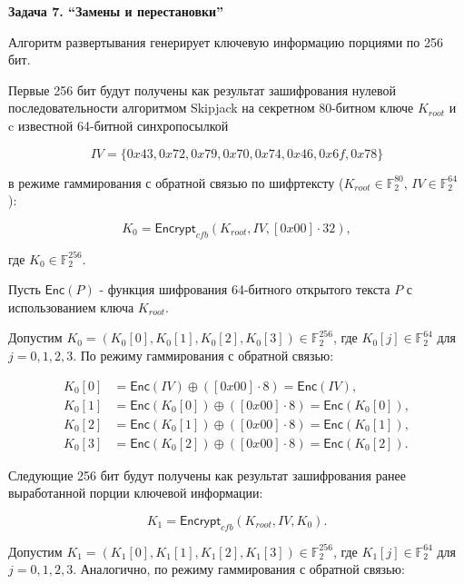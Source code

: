 \documentclass{article}
\newcommand{\FF}{\mathbb{F}}
\newcommand{\Enc}{\mathsf{Encrypt}}
\newcommand{\E}{\mathsf{Enc}}
\begin{document}
\begin{center}
    \Huge\textbf{Задача 7. ``Замены и перестановки''}
\end{center}

Алгоритм развертывания генерирует ключевую информацию порциями по 256 бит.

Первые 256 бит будут получены как результат зашифрования нулевой последовательности алгоритмом Skipjack на секретном 80-битном ключе $K_{root}$ и c известной 64-битной синхропосылкой

\begin{equation*}
    IV = \{ 0x43, 0x72, 0x79, 0x70, 0x74, 0x46, 0x6f, 0x78 \}
\end{equation*}

\noindent в режиме гаммирования с обратной связью по шифртексту ($K_{root} \in \FF_2^{80}$, $IV \in \FF_2^{64}$):

\begin{equation*}
    K_0 = \Enc_{cfb}(K_{root}, IV, [0x00] \cdot 32),
\end{equation*}

\noindent где $K_0 \in \FF_2^{256}$.

Пусть $\E(P)$ - функция шифрования 64-битного открытого текста $P$ с использованием ключа $K_{root}$.

Допустим $K_0 = (K_0[0], K_0[1], K_0[2], K_0[3]) \in \FF_2^{256}$, где $K_0[j] \in \FF_2^{64}$ для $j = 0, 1, 2, 3$. По режиму гаммирования с обратной связью:

\begin{align*}
    K_0[0] & = \E(IV) \oplus ([0x00] \cdot 8) = \E(IV), \\
    K_0[1] & = \E(K_0[0]) \oplus ([0x00] \cdot 8) = \E(K_0[0]), \\
    K_0[2] & = \E(K_0[1]) \oplus ([0x00] \cdot 8) = \E(K_0[1]), \\
    K_0[3] & = \E(K_0[2]) \oplus ([0x00] \cdot 8) = \E(K_0[2]).
\end{align*}

Следующие 256 бит будут получены как результат зашифрования ранее выработанной порции ключевой информации:

\begin{equation*}
    K_1 = \Enc_{cfb}(K_{root}, IV, K_0).
\end{equation*}

Допустим $K_1 = (K_1[0], K_1[1], K_1[2], K_1[3]) \in \FF_2^{256}$, где $K_1[j] \in \FF_2^{64}$ для $j = 0, 1, 2, 3$. Аналогично, по режиму гаммирования с обратной связью:
\end{document}
